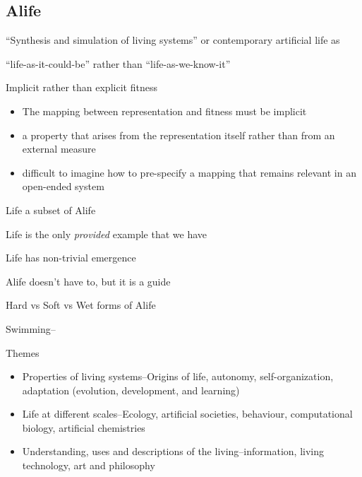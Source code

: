 \subsection{Alife}\label{alife}
\begin{NOTES}
``Synthesis and simulation of living systems'' or contemporary artificial life as 

``life-as-it-could-be'' rather than ``life-as-we-know-it'' \parencite{Langton1989}

Implicit rather than explicit fitness

\begin{itemize}
	\item
	The mapping between representation and fitness must be implicit
	\item
	a property that arises from the representation itself rather than from
	an external measure
	\item
	difficult to imagine how to pre-specify a mapping that remains
	relevant in an open-ended system
\end{itemize}

Life a subset of Alife

Life is the only \emph{provided} example that we have

Life has non-trivial emergence

Alife doesn't have to, but it is a guide

Hard vs Soft vs Wet forms of Alife

Swimming--\parencite{Terzopoulos1994}

Themes \parencite{Aguilar2014}

\begin{itemize}
	\item
	Properties of living systems--Origins of life, autonomy, self-organization, adaptation (evolution, development, and learning)
	\item
	Life at different scales--Ecology, artificial societies, behaviour, computational biology, artificial chemistries
	\item
	Understanding, uses and descriptions of the living--information, living technology, art and philosophy
\end{itemize}


\end{NOTES}
